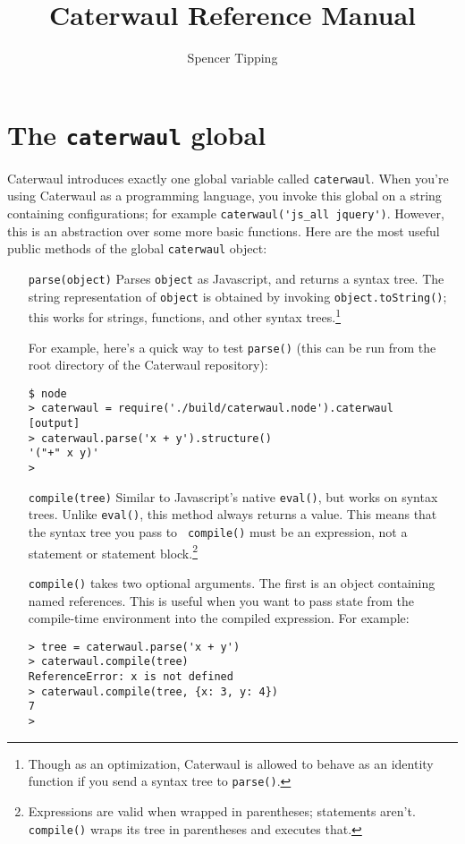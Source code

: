 \documentclass{report}
\title{Caterwaul Reference Manual}
\author{Spencer Tipping}
\begin{document}
\maketitle{}
\tableofcontents{}

\chapter{The {\tt caterwaul} global}
  Caterwaul introduces exactly one global variable called {\tt caterwaul}. When you're using Caterwaul as a programming language, you invoke this global on a string containing configurations;
  for example \verb|caterwaul('js_all jquery')|. However, this is an abstraction over some more basic functions. Here are the most useful public methods of the global {\tt caterwaul} object:

\begin{enumerate}
\item[{\tt parse(object)}]
  Parses {\tt object} as Javascript, and returns a syntax tree. The string representation of {\tt object} is obtained by invoking {\tt object.toString()}; this works for strings,
  functions, and other syntax trees.\footnote{Though as an optimization, Caterwaul is allowed to behave as an identity function if you send a syntax tree to {\tt parse()}.}

  For example, here's a quick way to test {\tt parse()} (this can be run from the root directory of the Caterwaul repository):

\begin{verbatim}
$ node
> caterwaul = require('./build/caterwaul.node').caterwaul
[output]
> caterwaul.parse('x + y').structure()
'("+" x y)'
>
\end{verbatim}

\item[{\tt compile(tree)}]
  Similar to Javascript's native {\tt eval()}, but works on syntax trees. Unlike {\tt eval()}, this method always returns a value. This means that the syntax tree you pass to {\tt
  compile()} must be an expression, not a statement or statement block.\footnote{Expressions are valid when wrapped in parentheses; statements aren't. {\tt compile()} wraps its tree in
  parentheses and executes that.}

  {\tt compile()} takes two optional arguments. The first is an object containing named references. This is useful when you want to pass state from the compile-time environment into the
  compiled expression. For example:

\begin{verbatim}
> tree = caterwaul.parse('x + y')
> caterwaul.compile(tree)
ReferenceError: x is not defined
> caterwaul.compile(tree, {x: 3, y: 4})
7
>
\end{verbatim}


\end{enumerate}
\end{document}
